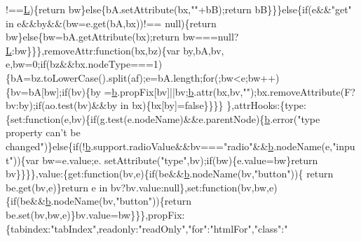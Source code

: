 \begin{DoxyCode}
      !==\hyperlink{a00039_a38ee4c0b5f4fe2a18d0c783af540d253}{L})\{\textcolor{keywordflow}{return} bw\}\textcolor{keywordflow}{else}\{bA.setAttribute(bx,\textcolor{stringliteral}{""}+bB);\textcolor{keywordflow}{return} bB\}\}\}\textcolor{keywordflow}{else}\{\textcolor{keywordflow}{if}(e&&\textcolor{stringliteral}{"get"} in e&&by&&(bw=e.get(bA,bx))!==
      null)\{\textcolor{keywordflow}{return} bw\}\textcolor{keywordflow}{else}\{bw=bA.getAttribute(bx);\textcolor{keywordflow}{return} bw===null?\hyperlink{a00039_a38ee4c0b5f4fe2a18d0c783af540d253}{L}:bw\}\}\},removeAttr:\textcolor{keyword}{function}(bx,bz)\{var by,bA,bv,
      e,bw=0;\textcolor{keywordflow}{if}(bz&&bx.nodeType===1)\{bA=bz.toLowerCase().split(af);e=bA.length;\textcolor{keywordflow}{for}(;bw<e;bw++)\{bv=bA[bw];\textcolor{keywordflow}{if}(bv)\{by
      =\hyperlink{a00039_aa4026ad5544b958e54ce5e106fa1c805}{b}.propFix[bv]||bv;\hyperlink{a00039_aa4026ad5544b958e54ce5e106fa1c805}{b}.attr(bx,bv,\textcolor{stringliteral}{""});bx.removeAttribute(F?bv:by);\textcolor{keywordflow}{if}(ao.test(bv)&&by in bx)\{bx[by]=\textcolor{keyword}{false}\}\}\}\}
      \},attrHooks:\{type:\{set:\textcolor{keyword}{function}(e,bv)\{\textcolor{keywordflow}{if}(g.test(e.nodeName)&&e.parentNode)\{\hyperlink{a00039_aa4026ad5544b958e54ce5e106fa1c805}{b}.error(\textcolor{stringliteral}{"type property can't be
       changed"})\}\textcolor{keywordflow}{else}\{\textcolor{keywordflow}{if}(!\hyperlink{a00039_aa4026ad5544b958e54ce5e106fa1c805}{b}.support.radioValue&&bv===\textcolor{stringliteral}{"radio"}&&\hyperlink{a00039_aa4026ad5544b958e54ce5e106fa1c805}{b}.nodeName(e,\textcolor{stringliteral}{"input"}))\{var bw=e.value;e.
      setAttribute(\textcolor{stringliteral}{"type"},bv);\textcolor{keywordflow}{if}(bw)\{e.value=bw\}\textcolor{keywordflow}{return} bv\}\}\}\},value:\{\textcolor{keyword}{get}:\textcolor{keyword}{function}(bv,e)\{\textcolor{keywordflow}{if}(be&&\hyperlink{a00039_aa4026ad5544b958e54ce5e106fa1c805}{b}.nodeName(bv,\textcolor{stringliteral}{"button"}))\{\textcolor{keywordflow}{
      return} be.get(bv,e)\}\textcolor{keywordflow}{return} e in bv?bv.value:null\},set:\textcolor{keyword}{function}(bv,bw,e)\{\textcolor{keywordflow}{if}(be&&\hyperlink{a00039_aa4026ad5544b958e54ce5e106fa1c805}{b}.nodeName(bv,\textcolor{stringliteral}{"button"}))\{\textcolor{keywordflow}{return} 
      be.set(bv,bw,e)\}bv.value=bw\}\}\},propFix:\{tabindex:\textcolor{stringliteral}{"tabIndex"},readonly:\textcolor{stringliteral}{"readOnly"},\textcolor{stringliteral}{"for"}:\textcolor{stringliteral}{"htmlFor"},\textcolor{stringliteral}{"class"}:\textcolor{stringliteral}{"
}
\end{DoxyCode}
